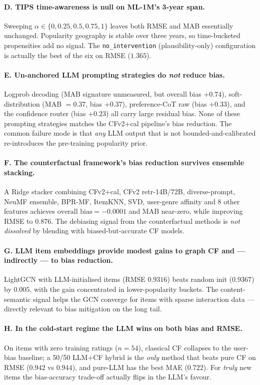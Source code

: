 \documentclass[11pt,a4paper]{article}
\begin{document}
\paragraph{D. TIPS time-awareness is null on ML-1M's 3-year span.}
Sweeping $\alpha \in \{0, 0.25, 0.5, 0.75, 1\}$ leaves both RMSE and
MAB essentially unchanged. Popularity geography is stable over three
years, so time-bucketed propensities add no signal. The
\texttt{no\_intervention} (plausibility-only) configuration is actually
the best of the six on RMSE ($1.365$).

\paragraph{E. Un-anchored LLM prompting strategies do \emph{not} reduce
bias.}
Logprob decoding (MAB signature unmeasured, but overall bias $+0.74$),
soft-distribution (MAB $=0.37$, bias $+0.37$), preference-CoT raw
(bias $+0.33$), and the confidence router (bias $+0.23$) all carry large
residual bias. None of these prompting strategies matches the
CFv2+cal pipeline's bias reduction. The common failure mode is that
\emph{any} LLM output that is not bounded-and-calibrated re-introduces
the pre-training popularity prior.

\paragraph{F. The counterfactual framework's bias reduction survives
ensemble stacking.}
A Ridge stacker combining CFv2+cal, CFv2 retr-14B/72B, diverse-prompt,
NeuMF ensemble, BPR-MF, ItemKNN, SVD, user-genre affinity and 8 other
features achieves $\text{overall bias} = -0.0001$ and MAB near-zero,
while improving RMSE to $0.876$. The debiasing signal from the
counterfactual methods is \emph{not dissolved} by blending with
biased-but-accurate CF models.

\paragraph{G. LLM item embeddings provide modest gains to graph CF and
--- indirectly --- to bias reduction.}
LightGCN with LLM-initialised items (RMSE $0.9316$) beats random init
($0.9367$) by $0.005$, with the gain concentrated in lower-popularity
buckets. The content-semantic signal helps the GCN converge for items
with sparse interaction data --- directly relevant to bias mitigation on
the long tail.

\paragraph{H. In the cold-start regime the LLM wins on both bias and
RMSE.}
On items with zero training ratings ($n{=}54$), classical CF collapses to
the user-bias baseline; a 50/50 LLM$+$CF hybrid is the \emph{only} method
that beats pure CF on RMSE ($0.942$ vs $0.944$), and pure-LLM has the
best MAE ($0.722$). For \emph{truly} new items the bias-accuracy
trade-off actually flips in the LLM's favour.
\end{document}
